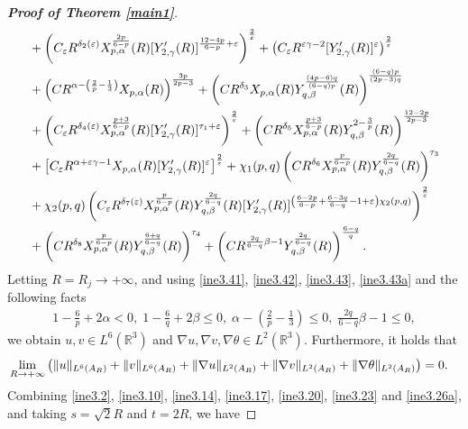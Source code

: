 \documentclass[11pt,reqno]{amsart}
\numberwithin{Thm}{section}
\begin{document}
\begin{proof}[{\bf Proof of Theorem \ref{main1}}]
\begin{align}
&+\left(C_\varepsilon R^{\delta_2(\varepsilon)}X^\frac{2p}{6-p}_{p,\alpha}(R)[Y'_{2,\gamma}(R)]^{\frac{12-4p}{6-p}+\varepsilon}\right)^\frac{2}{\varepsilon}+\left(C_\varepsilon R^{\varepsilon\gamma-2}[Y'_{2,\gamma}(R)]^{\varepsilon}\right)^\frac{2}{\varepsilon}\notag\\
&+\left(CR^{\alpha-\left(\frac{2}{p}-\frac{1}{3}\right)}X_{p,\alpha}(R)\right)^\frac{3p}{2p-3}+\left(CR^{\delta_3}X_{p,\alpha}(R)Y^\frac{(4p-6)q}{(6-q)p}_{q,\beta}(R)\right)^\frac{(6-q)p}{(2p-3)q}\notag\\
&+\left(C_\varepsilon R^{\delta_4(\varepsilon)}X^\frac{p+3}{6-p}_{p,\alpha}(R)[Y'_{2,\gamma}(R)]^{\tau_1+\varepsilon}\right)^\frac{2}{\varepsilon}+\left(CR^{\delta_5}X^\frac{p+3}{6-p}_{p,\alpha}(R)Y^{2-\frac{3}{p}}_{q,\beta}(R)\right)^\frac{12-2p}{2p-3}\\
&+\left[C_\varepsilon R^{\alpha+\varepsilon\gamma-1}X_{p,\alpha}(R)[Y'_{2,\gamma}(R)]^{\varepsilon}\right]^\frac{2}{\varepsilon}+\chi_1(p,q)\left(CR^{\delta_6}X^\frac{p}{6-p}_{p,\alpha}(R)Y^\frac{2q}{6-q}_{q,\beta}(R)\right)^{\tau_3}\notag\\
&+\chi_2(p,q)\left(C_\varepsilon R^{\delta_7(\varepsilon)}X^\frac{p}{6-p}_{p,\alpha}(R)Y^\frac{2q}{6-q}_{q,\beta}(R)[Y'_{2,\gamma}(R)]^{\left(\frac{6-2p}{6-p}+\frac{6-3q}{6-q}-1+\varepsilon\right)\chi_2(p,q)}\right)^\frac{2}{\varepsilon}\notag\\
&+\left(CR^{\delta_8}X^\frac{p}{6-p}_{p,\alpha}(R)Y^\frac{6+q}{6-q}_{q,\beta}(R)\right)^{\tau_4}+\left(CR^{\frac{2q}{6-q}\beta-1}Y^\frac{2q}{6-q}_{q,\beta}(R)\right)^\frac{6-q}{q}.\notag
\end{align}
Letting $R=R_j\rightarrow+\infty$, and using \eqref{ine3.41}, \eqref{ine3.42}, \eqref{ine3.43}, \eqref{ine3.43a} and the following facts
\begin{align*}
1-\frac{6}{p}+2\alpha<0,\;1-\frac{6}{q}+2\beta\leq0,\;\alpha-\left(\frac{2}{p}-\frac{1}{3}\right)\leq0,\;\frac{2q}{6-q}\beta-1\leq0,
\end{align*}
we obtain $u,v\in L^6(\mathbb{R}^3)$ and $\nabla u,\nabla v,\nabla \theta\in L^2(\mathbb{R}^3)$. Furthermore, it holds that
\begin{equation}\label{ine3.45}
\aligned
&\lim_{R\rightarrow+\infty}\left(\|u\|_{L^6(A_{R})}+\|v\|_{L^6(A_{R})}+\|\nabla u\|_{L^2(A_{R})}+\|\nabla v\|_{L^2(A_{R})}+\|\nabla \theta\|_{L^2(A_{R})}\right)=0.
\endaligned
\end{equation}
Combining  \eqref{ine3.2}, \eqref{ine3.10}, \eqref{ine3.14}, \eqref{ine3.17}, \eqref{ine3.20}, \eqref{ine3.23} and \eqref{ine3.26a}, and taking $s=\sqrt{2}R$ and $t=2R$, we have

\end{proof}
\end{document}
